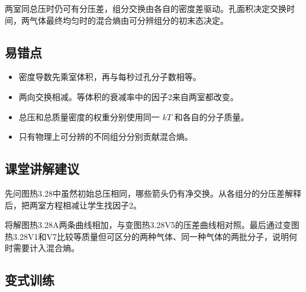 \documentclass[UTF8,fontset=fandol,a4paper,11pt]{ctexart}
\begin{document}
两室同总压时仍可有分压差，组分交换由各自的密度差驱动。孔面积决定交换时间，两气体最终均匀时的混合熵由可分辨组分的初末态决定。



\subsection*{易错点}

\begin{itemize}
\item 密度导数先乘室体积，再与每秒过孔分子数相等。
\item 两向交换相减。等体积的衰减率中的因子2来自两室都改变。
\item 总压和总质量密度的权重分别使用同一 $kT$ 和各自的分子质量。
\item 只有物理上可分辨的不同组分分别贡献混合熵。
\end{itemize}



\subsection*{课堂讲解建议}

先问图热3.28中虽然初始总压相同，哪些箭头仍有净交换。从各组分的分压差解释后，把两室方程相减让学生找因子2。

将解图热3.28A两条曲线相加，与变图热3.28V5的压差曲线相对照。最后通过变图热3.28V1和V7比较等质量但可区分的两种气体、同一种气体的两批分子，说明何时需要计入混合熵。



\subsection*{变式训练}
\end{document}
